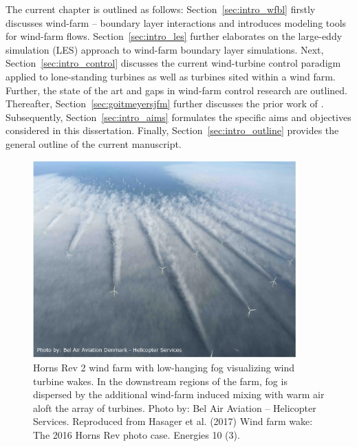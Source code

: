 The current chapter is outlined as follows: Section~\ref{sec:intro_wfbl} firstly discusses wind-farm -- boundary layer interactions and introduces modeling tools for wind-farm flows. Section~\ref{sec:intro_les} further elaborates on the large-eddy simulation (LES) approach to wind-farm boundary layer simulations. Next, Section~\ref{sec:intro_control} discusses the current wind-turbine control paradigm applied to lone-standing turbines as well as turbines sited within a wind farm. Further, the state of the art and gaps in wind-farm control research are outlined. Thereafter, Section~\ref{sec:goitmeyersjfm} further discusses the prior work of \cite{goit2015optimal}. Subsequently, Section~\ref{sec:intro_aims} formulates the specific aims and objectives considered in this dissertation. Finally, Section~\ref{sec:intro_outline} provides the general outline of the current manuscript.

\begin{figure}[t]
	\centering
	\includegraphics[width=0.9\textwidth]{chapters/introduction/HR2.eps}
	\caption{Horns Rev 2 wind farm with low-hanging fog visualizing wind turbine wakes. In the downstream regions of the farm, fog is dispersed by the additional wind-farm induced mixing with warm air aloft the array of turbines. Photo by: Bel Air Aviation -- Helicopter Services. Reproduced from Hasager et al. (2017) Wind farm wake: The 2016 Horns Rev photo case. Energies 10 (3). \label{fig:horns_rev}}
\end{figure}



